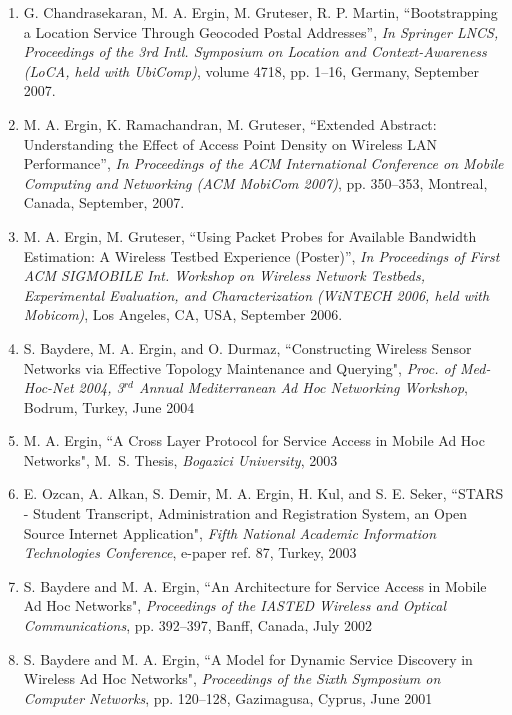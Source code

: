 \documentclass[10pt]{article}
\begin{document}
\begin{enumerate}
\item G. Chandrasekaran, M. A. Ergin, M. Gruteser, R. P. Martin, ``Bootstrapping
a Location Service Through Geocoded Postal Addresses'', \emph{In Springer LNCS, 
Proceedings of the 3rd Intl. Symposium on Location and Context-Awareness (LoCA,
held with UbiComp)}, volume 4718, pp. 1--16, Germany, September 2007.

\item M. A. Ergin, K. Ramachandran, M. Gruteser, ``Extended Abstract:
Understanding the Effect of Access Point Density on Wireless LAN Performance'',
\emph{In Proceedings of the ACM International Conference on Mobile Computing
and Networking (ACM MobiCom 2007)}, pp. 350--353, Montreal, Canada, September,
2007.

\item M. A. Ergin, M. Gruteser, ``Using Packet Probes for Available Bandwidth
Estimation: A Wireless Testbed Experience (Poster)'', \emph{In Proceedings of
First ACM SIGMOBILE Int. Workshop on Wireless Network Testbeds, Experimental
Evaluation, and Characterization (WiNTECH 2006, held with Mobicom)}, Los
Angeles, CA, USA, September 2006.

\item S. Baydere, M. A. Ergin, and O. Durmaz, ``Constructing Wireless Sensor
Networks via Effective Topology Maintenance and Querying", \emph{Proc. of
Med-Hoc-Net 2004, 3$^{rd}$ Annual Mediterranean Ad Hoc Networking
Workshop}, Bodrum, Turkey, June 2004

\item M. A. Ergin, ``A Cross Layer Protocol for Service Access in Mobile Ad Hoc
Networks", M.~S. Thesis, \emph{Bogazici University}, 2003

\item E. Ozcan, A. Alkan, S. Demir, M. A. Ergin, H. Kul, and S. E. Seker,
``STARS - Student Transcript, Administration and Registration System, an Open
Source Internet Application", \emph{Fifth National Academic Information
Technologies Conference}, e-paper ref. 87, Turkey, 2003

\item S. Baydere and M. A. Ergin, ``An Architecture for Service Access in Mobile
Ad Hoc Networks", \emph{Proceedings of the IASTED Wireless and Optical
Communications}, pp. 392--397, Banff, Canada, July 2002

\item S. Baydere and M. A. Ergin, ``A Model for Dynamic Service Discovery in
Wireless Ad Hoc Networks", \emph{Proceedings of the Sixth Symposium on
Computer Networks}, pp. 120--128, Gazimagusa, Cyprus, June 2001
\end{enumerate}
\end{document}
